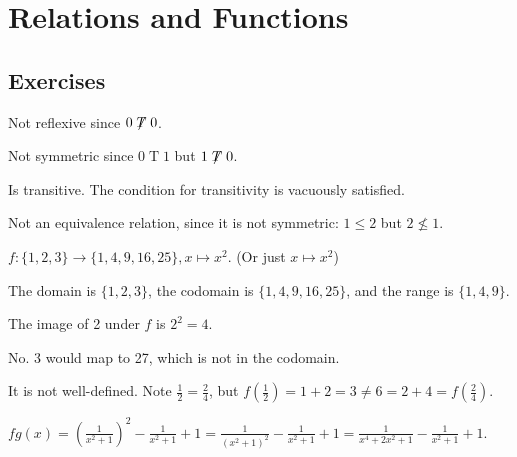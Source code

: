 \section{Relations and Functions}
\subsection*{Exercises}
\begin{questions}
    \item \begin{partquestions}{\alph*}
        \item Not reflexive since $0\not\mathrel{T}0$.
        \item Not symmetric since $0\mathrel{T}1$ but $1\not\mathrel{T}0$.
        \item Is transitive. The condition for transitivity is vacuously satisfied.
    \end{partquestions}

    \item Not an equivalence relation, since it is not symmetric: $1 \leq 2$ but $2 \not\leq 1$.

    \item \begin{partquestions}{\roman*}
        \item $f: \{1, 2, 3\} \to \{1, 4, 9, 16, 25\}, x \mapsto x^2$. (Or just $x \mapsto x^2$)
        \item The domain is $\{1, 2, 3\}$, the codomain is $\{1, 4, 9, 16, 25\}$, and the range is $\{1, 4, 9\}$.
        \item The image of 2 under $f$ is $2^2 = 4$.
        \item No. 3 would map to 27, which is not in the codomain.
    \end{partquestions}

    \item It is not well-defined. Note $\frac 12 = \frac 24$, but $f(\frac12) = 1 + 2 = 3 \neq 6 = 2 + 4 = f(\frac24)$.

    \item $fg(x) = \left(\frac1{x^2+1}\right)^2 - \frac1{x^2+1} + 1 = \frac1{(x^2+1)^2} - \frac1{x^2+1} + 1 = \frac1{x^4+2x^2+1} - \frac1{x^2+1} + 1$.


\end{questions}
